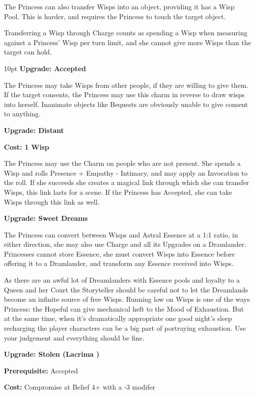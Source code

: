 The Princess can also transfer Wisps into an object, providing it has a Wisp Pool. This is harder, and requires the Princess to touch the target object. 

Transferring a Wisp through Charge counts as spending a Wisp when measuring against a Princess' Wisp per turn limit, and she cannot give more Wisps than the target can hold.

\begin{myindentpar}{10pt} \textbf{Upgrade: Accepted}

The Princess may take Wisps from other people, if they are willing to give them. If the target consents, the Princess may use this charm in reverse to draw wisps into herself. Inanimate objects like Bequests are obviously unable to give consent to anything. 

\textbf{Upgrade: Distant}

\textbf{Cost: 1 Wisp}

\noindent The Princess may use the Charm on people who are not present. She spends a Wisp and rolls Presence + Empathy - Intimacy, and may apply an Invocation to the roll. If she succeeds she creates a magical link through which she can transfer Wisps, this link lasts for a scene. If the Princess has Accepted, she can take Wisps through this link as well. 

\textbf{Upgrade: Sweet Dreams}

The Princess can convert between Wisps and Astral Essence at a 1:1 ratio, in either direction, she may also use Charge and all its Upgrades on a Dramlander. Princesses cannot store Essence, she must convert Wisps into Essence before offering it to a Dramlander, and transform any Essence received into Wisps.

As there are an awful lot of Dreamlanders with Essence pools and loyalty to a Queen and her Court the Storyteller should be careful not to let the Dreamlands become an infinite source of free Wisps. Running low on Wisps is one of the ways Princess: the Hopeful can give mechanical heft to the Mood of Exhaustion. But at the same time, when it's dramatically appropriate one good night's sleep recharging the player characters can be a big part of portraying exhaustion. Use your judgement and everything should be fine. 

\textbf{Upgrade: Stolen (Lacrima \textbullet\textbullet)}

\noindent \textbf{Prerequisite:} Accepted

\noindent \textbf{Cost:} Compromise at Belief 4+ with a -3 modifer


\end{myindentpar}
